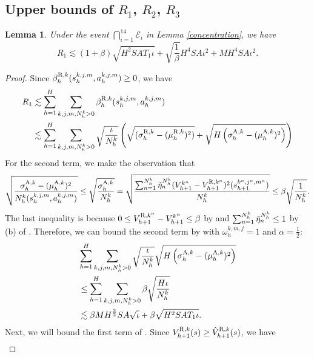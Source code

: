 \documentclass{article}
\newtheorem{lemma}{Lemma}[section]
\newcommand{\R}{\textnormal{R}}
\newcommand{\A}{\textnormal{A}}
\begin{document}
\subsection{\texorpdfstring{Upper bounds of $R_1$, $R_2$, $R_3$}{Upper bounds of R1, R2, R3}}
\begin{lemma}
    \label{upperboundr1}
    Under the event $\bigcap_{i=1}^{14}\mathcal{E}_i$ in Lemma \ref{concentration}, we have
    $$R_1 \lesssim  (1+\beta) \sqrt{H^2SAT_1\iota} + \sqrt{\frac{1}{\beta}}H^4SA\iota^2+ MH^4SA\iota^2.$$
\end{lemma}
\begin{proof}
Since $\beta_h^{\R,k}(s_h^{k,j,m}, a_h^{k,j,m}) \geq 0$, we have
\begin{align}
\label{r1begin}
    R_1 
    &\lesssim \sum_{h=1}^H\sum_{k,j,m,N_h^k >0}\beta_h^{\R,k}(s_h^{k,j,m}, a_h^{k,j,m}) \nonumber\\
    &\lesssim \sum_{h=1}^H\sum_{k,j,m,N_h^k >0} \sqrt{\frac{\iota}{N_h^k}}\left(\sqrt{(\sigma_h^{\R,k}-(\mu_h^{\R,k})^2)} +\sqrt{H\left(\sigma_h^{\A,k}-(\mu_h^{\A,k})^2\right)}\right)
\end{align}
    For the second term, we make the observation that
    \begin{equation}
    \label{advupper}
        \sqrt{\frac{\sigma_h^{\A,k}-(\mu_h^{\A,k})^2}{N_h^k(s_h^{k,j,m}, a_h^{k,j,m})}} \leq \sqrt{\frac{\sigma_h^{\A,k}}{N_h^k}} = \sqrt{\frac{\sum_{n=1}^{N_h^k}\Tilde{\eta}_n^{N_h^k}(V_{h+1}^{k^n}-V_{h+1}^{\R,k^n})^2(s_{h+1}^{k^n,j^n,m^n})}{N_h^k}} \leq \beta\sqrt{\frac{1}{N_h^k}}.
    \end{equation}
The last inequality is because $0 \leq V_{h+1}^{\R,k^n} -V_{h+1}^{k^n} \leq \beta$ by  and $\sum_{n=1}^{N_h^k}\Tilde{\eta}_n^{N_h^k} \leq 1$ by (b) of . Therefore, we can bound the second term by  with $\omega_h^{k,m,j} = 1$ and $\alpha = \frac{1}{2}$:
\begin{align}
    \label{r12}
    &\sum_{h=1}^H\sum_{k,j,m,N_h^k >0} \sqrt{\frac{\iota}{N_h^k}}\sqrt{H\left(\sigma_h^{\A,k}-(\mu_h^{\A,k})^2\right)}\nonumber\\
    &\leq \sum_{h=1}^H\sum_{k,j,m,N_h^k >0}\beta\sqrt{\frac{H\iota}{N_h^k}} \nonumber\\
    &\lesssim \beta MH^{\frac{3}{2}}SA\sqrt{\iota} + \beta \sqrt{H^2SAT_1\iota}.
\end{align}
Next, we will bound the first term of . Since $V_{h+1}^{\R,k}(s) \geq \hat{V}_{h+1}^{\R,k}(s)$, we have 
\begin{align}

\end{align}
\end{proof}
\end{document}
